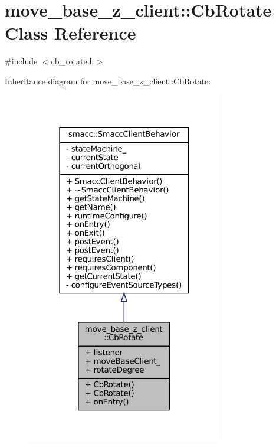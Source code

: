 \hypertarget{classmove__base__z__client_1_1CbRotate}{}\section{move\+\_\+base\+\_\+z\+\_\+client\+:\+:Cb\+Rotate Class Reference}
\label{classmove__base__z__client_1_1CbRotate}


{\ttfamily \#include $<$cb\+\_\+rotate.\+h$>$}



Inheritance diagram for move\+\_\+base\+\_\+z\+\_\+client\+:\+:Cb\+Rotate\+:
\nopagebreak
\begin{figure}[H]
\begin{center}
\leavevmode
\includegraphics[width=244pt]{classmove__base__z__client_1_1CbRotate__inherit__graph}
\end{center}
\end{figure}


